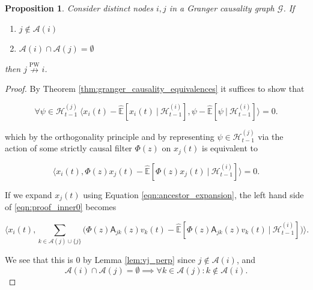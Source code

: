 \documentclass{statsoc}
\def\npwgc{\overset{\text{PW}}{\nrightarrow}}  %
\def\gcg{\mathcal{G}}  %
\def\A{\mathsf{A}}  %
\def\H{\mathcal{H}}  %
\newcommand{\linE}[2]{\hat{\E}[#1\ |\ #2]}  %
\newcommand{\anc}[1]{\mathcal{A}(#1)}  %
\newtheorem{proposition}{Proposition}
\def\H{\mathcal{H}}  %
\def\E{\mathbb{E}}  %
\newcommand{\inner}[2]{\langle #1, #2 \rangle}  %
\begin{document}
\begin{proposition}
  \label{prop:ancestor_uncorrelated}
  Consider distinct nodes $i, j$ in a Granger causality graph $\gcg$.
  If

  \begin{enumerate}[label=(\alph*)]
  \item{$j \not\in \anc{i}$}
  \item{$\anc{i}\cap\anc{j} = \emptyset$}
  \end{enumerate}

  then $j \npwgc i$.
\end{proposition}
\begin{proof}
  By Theorem \ref{thm:granger_causality_equivalences} it suffices to show that

  \begin{equation*}
    \forall \psi \in \H_{t - 1}^{(j)}\ \inner{x_i(t) - \linE{x_i(t)}{\H_{t - 1}^{(i)}}}{\psi - \linE{\psi}{\H_{t - 1}^{(i)}}} = 0.
  \end{equation*}

  which by the orthogonality principle and by representing
  $\psi \in \H_{t - 1}^{(j)}$ via the action of some strictly causal filter
  $\Phi(z)$ on $x_j(t)$ is equivalent to

  \begin{equation}
    \label{eqn:proof_inner0}
    \inner{x_i(t)}{\Phi(z)x_j(t) - \linE{\Phi(z)x_j(t)}{\H_{t - 1}^{(i)}}} = 0.
  \end{equation}

  If we expand $x_j(t)$ using Equation \eqref{eqn:ancestor_expansion},
  the left hand side of \eqref{eqn:proof_inner0} becomes

  \begin{equation*}
    \inner{x_i(t)}{\sum_{k \in \anc{j} \cup \{j\}} \Big(\Phi(z)\A_{jk}(z)v_k(t) - \linE{\Phi(z)\A_{jk}(z)v_k(t)}{\H_{t - 1}^{(i)}}\Big)}.
  \end{equation*}

  We see that this is $0$ by Lemma \ref{lem:vj_perp} since
  $j \not \in \anc{i}$, and
  \[
    \anc{i} \cap \anc{j} = \emptyset \implies \forall k \in \anc{j}: k \not \in \anc{i}.
  \]
\end{proof}

\end{document}
